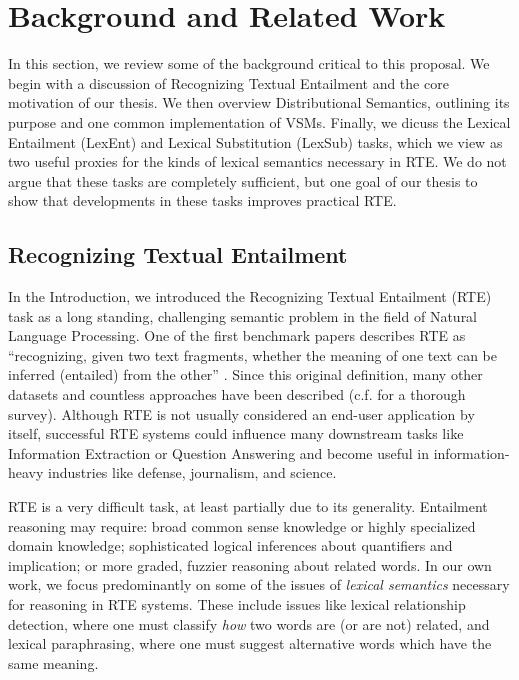 \documentclass[12pt]{article}
\begin{document}
\pagebreak
\section{Background and Related Work}
\label{sec:background}

In this section, we review some of the background critical to this proposal.
We begin with a discussion of Recognizing Textual Entailment and the core
motivation of our thesis.  We then overview Distributional Semantics, outlining
its purpose and one common implementation of VSMs. Finally, we dicuss the
Lexical Entailment (LexEnt) and Lexical Substitution (LexSub) tasks, which we
view as two useful proxies for the kinds of lexical semantics necessary in
RTE. We do not argue that these tasks are completely sufficient, but one goal
of our thesis to show that developments in these tasks improves practical RTE.

\subsection{Recognizing Textual Entailment}
\label{sec:textent}

In the Introduction, we introduced the Recognizing Textual Entailment (RTE)
task as a long standing, challenging semantic problem in the field of
Natural Language Processing.  One of the first benchmark papers describes RTE
as ``recognizing, given two text fragments, whether the meaning of one text can
be inferred (entailed) from the other'' \cite{dagan:2006:mlc}. Since this
original definition, many other datasets
\cite{giampiccolo:2007:pascal,bentivogli:2009:tac,marelli:2014:semeval} and
countless approaches have been described (c.f. 
for a thorough survey). Although RTE is not usually considered an
end-user application by itself, successful RTE systems could influence many
downstream tasks like Information Extraction or Question Answering and become
useful in information-heavy industries like defense, journalism, and science.

RTE is a very difficult task, at least partially due to its generality.
Entailment reasoning may require: broad common sense knowledge or highly
specialized domain knowledge; sophisticated logical inferences
about quantifiers and implication; or more graded, fuzzier reasoning about
related words. In our own work, we focus predominantly on some of the issues
of {\em lexical semantics} necessary for reasoning in RTE systems. These
include issues like lexical relationship detection, where one must classify
{\em how} two words are (or are not) related, and lexical paraphrasing, where
one must suggest alternative words which have the same meaning.
\end{document}
